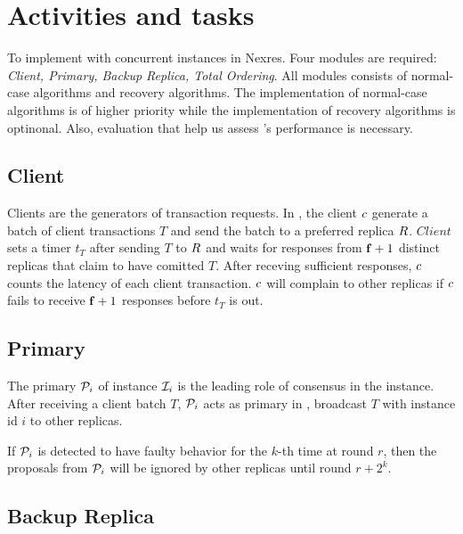 \section{Activities and tasks}

\par To implement \RCC{} with concurrent \PBFT{} instances in Nexres. Four modules are required: \emph{Client, 
Primary, Backup Replica, Total Ordering}. All modules consists of normal-case algorithms and recovery algorithms. 
The implementation of normal-case algorithms is of higher priority while the implementation of recovery algorithms 
is optinonal. Also, evaluation that help us assess \RCC{}'s performance is necessary.

\subsection{Client}

\par Clients are the generators of transaction requests. In \RCC{}, the client $\Client{}$ generate a batch 
of client transactions $T$ and send the batch to a preferred replica $\Replica{}$. $Client{}$ sets a timer 
$t_T$ after sending $T$ to $\Replica{}$ and waits for responses from $\mathbf{f}+1$ distinct replicas that claim 
to have comitted $T$. After receving sufficient responses, $\Client{}$ counts the latency of each client 
transaction. $\Client{}$ will complain to other replicas if $\Client{}$ fails to receive $\mathbf{f}+1$ responses 
before $t_T$ is out.

\subsection{Primary}

\par The primary $\mathcal{P}_{i}$ of instance $\mathcal{I}_{i}$ is the leading role of consensus in the 
instance. After receiving a client batch $T$, $\mathcal{P}_{i}$ acts as primary in \PBFT{}, broadcast $T$ 
with instance id $i$ to other replicas.

\par If $\mathcal{P}_{i}$ is detected to have faulty behavior for the $k$-th time at round $r$, then the proposals 
from $\mathcal{P}_{i}$ will be ignored by other replicas until round $r + 2^k$.

\subsection{Backup Replica}

